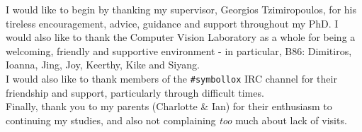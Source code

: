 
\begin{acknowledgements}

  I would like to begin by thanking my supervisor, Georgios
  Tzimiropoulos, for his tireless encouragement, advice, guidance and
  support throughout my PhD. I would also like to thank the Computer
  Vision Laboratory as a whole for being a welcoming, friendly and
  supportive environment - in particular, B86: Dimitiros, Ioanna,
  Jing, Joy, Keerthy, Kike and Siyang. \\ [0.3em]

  \noindent I would also like to thank members of the
  \verb|#symbollox| IRC channel for their friendship and support,
  particularly through difficult times. \\ [0.3em]

  \noindent Finally, thank you to my parents (Charlotte \& Ian) for their
  enthusiasm to continuing my studies, and also not complaining
  \textit{too} much about lack of visits.



\end{acknowledgements}
